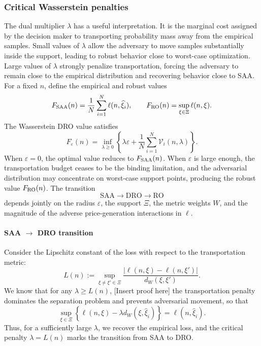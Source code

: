 \documentclass[11pt]{article}
\newcommand{\XiSet}{\Xi}
\newcommand{\eps}{\varepsilon}
\newcommand{\hxi}{\widehat\xi}
\theoremstyle{plain}
\theoremstyle{definition}
\begin{document}
\subsubsection{Critical Wasserstein penalties} 
\label{subsec:critical-lambda} 
The dual multiplier $\lambda$ has a useful interpretation. 
It is the marginal cost assigned by the decision maker to transporting probability mass away from the empirical samples. Small values of $\lambda$ allow the adversary to move samples substantially inside the support, leading to robust behavior close to worst-case optimization. 
Large values of $\lambda$ strongly penalize transportation, forcing the adversary to remain close to the empirical distribution and recovering behavior close to SAA. 
For a fixed $n$, define the empirical and robust values \[ F_{\rm SAA}(n) = \frac1N\sum_{i=1}^N \ell(n,\hxi_i), \qquad F_{\rm RO}(n) = \sup_{\xi\in\XiSet}\ell(n,\xi). \] 
The Wasserstein DRO value satisfies \[ F_{\eps}(n) = \inf_{\lambda\ge0} \left\{ \lambda\eps + \frac1N\sum_{i=1}^N \mathcal V_i(n,\lambda) \right\}. \] 
When $\eps=0$, the optimal value reduces to $F_{\rm SAA}(n)$. 
When $\eps$ is large enough, the transportation budget ceases to be the binding limitation, and the adversarial distribution may concentrate on worst-case support points, producing the robust value $F_{\rm RO}(n)$. 
The transition \[ \mathrm{SAA} \longrightarrow \mathrm{DRO} \longrightarrow \mathrm{RO} \] depends jointly on the radius $\eps$, the support $\XiSet$, the metric weights $W$, and the magnitude of the adverse price-generation interactions in $\ell$. 

\paragraph{SAA $\to$ DRO transition}
Consider the Lipschitz constant of the loss with respect to the transportation metric:
\begin{equation} 
    \label{eq:lipschitz-threshold} L(n) := \sup_{\xi\neq\xi'\in\XiSet} \frac{|\ell(n,\xi)-\ell(n,\xi')|} {d_W(\xi,\xi')}. 
\end{equation} 
We know that for any $\lambda\ge L(n)$, \color{red}[Insert proof here]\color{black} the transportation penalty dominates the separation problem and prevents adversarial movement, so that \[ \sup_{\xi\in\XiSet} \left\{ \ell(n,\xi)-\lambda d_W(\xi,\hxi_i) \right\} = \ell(n,\hxi_i). \] 
Thus, for a sufficiently large $\lambda$, we recover the empirical loss, and the critical penalty $\lambda=L(n)$ marks the transition from SAA to DRO.
\end{document}
